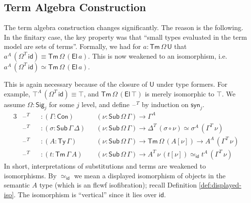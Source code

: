 \documentclass[12pt,a4paper,twoside,openany]{book}
\theoremstyle{remark}
\theoremstyle{definition}
\theoremstyle{theorem}
\newcommand{\id}{\mathsf{id}}
\newcommand{\Con}{\mathsf{Con}}
\newcommand{\Sub}{\mathsf{Sub}}
\newcommand{\Tm}{\mathsf{Tm}}
\newcommand{\Ty}{\mathsf{Ty}}
\newcommand{\U}{\mathsf{U}}
\newcommand{\El}{\mathsf{El}}
\newcommand{\blank}{\mathord{\hspace{1pt}\text{--}\hspace{1pt}}}
\newcommand{\Sig}{\mathsf{Sig}}
\newcommand{\syn}{\mathsf{syn}}
\begin{document}
\subsection{Term Algebra Construction}
\label{sec:iqii-term-algebra-construction}

The term algebra construction changes significantly. The reason is the
following. In the finitary case, the key property was that ``small types
evaluated in the term model are sets of terms''. Formally, we had for $a :
\Tm\,\Omega\,\U$ that $a^A\,(\Omega^T\,\id) \equiv \Tm\,\Omega\,(\El\,a)$.  This
is now weakened to an isomorphism, i.e.\ $a^A\,(\Omega^T\,\id) \simeq
\Tm\,\Omega\,(\El\,a)$.

This is again necessary because of the closure of $\U$ under type formers. For
example, $\top^A\,(\Omega^T\,\id) \equiv \top$, and $\Tm\,\Omega\,(\El\,\top)$
is merely isomorphic to $\top$. We assume $\Omega : \Sig_j$ for some $j$
level, and define $\blank^T$ by induction on $\syn_j$.
\begin{alignat*}{3}
  &\blank^T &&: (\Gamma : \Con)&&(\nu : \Sub\,\Omega\,\Gamma) \to \Gamma^A\\
  &\blank^T &&: (\sigma : \Sub\,\Gamma\,\Delta)&&(\nu : \Sub\,\Omega\,\Gamma) \to \Delta^T\,(\sigma \circ \nu) \simeq \sigma^A\,(\Gamma^T\,\nu)\\
  &\blank^T &&: (A : \Ty\,\Gamma)&&(\nu : \Sub\,\Omega\,\Gamma) \to \Tm\,\Omega\,(A[\nu])
  \to A^A\,(\Gamma^T\,\nu)\\
  &\blank^T &&: (t : \Tm\,\Gamma\,A)&&(\nu : \Sub\,\Omega\,\Gamma) \to A^T\,\nu\,(t[\nu]) \simeq_{\id} t^A\,(\Gamma^T\,\nu)
\end{alignat*}
In short, interpretations of substitutions and terms are weakened to
isomorphisms.  By $\simeq_{\id}$ we mean a displayed isomorphism of objects in
the semantic $A$ type (which is an flcwf isofibration); recall Definition
\ref{def:displayed-iso}.  The isomorphism is ``vertical'' since it lies over
$\id$.
\end{document}
